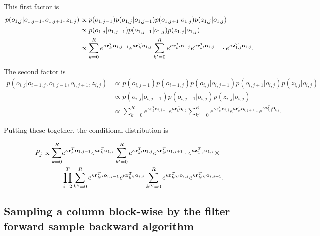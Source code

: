 \documentclass[11pt]{article}
\begin{document}
\noindent This first factor is
%
\begin{align}
\label{eq:first_factor}
p(o_{1,j}|o_{1,j-1},o_{1,j+1},z_{1,j}) &\propto p(o_{1,j-1}) p(o_{1,j}|o_{1,j-1})p(o_{1,j+1}|o_{1,j})p(z_{1,j}|o_{1,j}) \\
&\propto p(o_{1,j}|o_{1,j-1})p(o_{1,j+1}|o_{1,j})p(z_{1,j}|o_{1,j}) \notag \\
&\propto \sum_{k=0}^R e^{\kappa \mathbf{r}_k^T \mathbf{o}_{1,j-1}} e^{\kappa \mathbf{r}_k^T \mathbf{o}_{1,j}}
\sum_{k'=0}^R e^{\kappa \mathbf{r}_{k'}^T \mathbf{o}_{1,j}} e^{\kappa \mathbf{r}_{k'}^T \mathbf{o}_{1,j+1}}
\cdot e^{\kappa \mathbf{z}_{1,j}^T\mathbf{o}_{1,j} }. \notag
\end{align}

\noindent The second factor is
%
\begin{align*}
p(o_{i,j}|o_{i-1,j},o_{i,j-1},o_{i,j+1},z_{i,j}) &\propto p(o_{i,j-1}) p(o_{i-1,j}) p(o_{i,j}|o_{i,j-1})p(o_{i,j+1}|o_{i,j})p(z_{i,j}|o_{i,j}) \\
&\propto p(o_{i,j}|o_{i,j-1})p(o_{i,j+1}|o_{i,j})p(z_{i,j}|o_{i,j}) \\
&\propto \sum_{k=0}^R e^{\kappa \mathbf{r}_k^T \mathbf{o}_{i,j-1}} e^{\kappa \mathbf{r}_k^T \mathbf{o}_{i,j}}
\sum_{k'=0}^R e^{\kappa \mathbf{r}_{k'}^T \mathbf{o}_{i,j}} e^{\kappa \mathbf{r}_{k'}^T \mathbf{o}_{i,j+1}}
\cdot e^{\kappa \mathbf{z}_{i,j}^T\mathbf{o}_{i,j} }.
\end{align*}

\noindent Putting these together, the conditional distribution is

\begin{align}
P_j \propto \sum_{k=0}^R &e^{\kappa \mathbf{r}_k^T \mathbf{o}_{1,j-1}} e^{\kappa \mathbf{r}_k^T \mathbf{o}_{1,j}}
\sum_{k'=0}^R e^{\kappa \mathbf{r}_{k'}^T \mathbf{o}_{1,j}} e^{\kappa \mathbf{r}_{k'}^T \mathbf{o}_{1,j+1}}
\cdot e^{\kappa \mathbf{z}_{1,j}^T\mathbf{o}_{1,j} } \times \\
&\prod_{i=2}^T \sum_{k''=0}^R e^{\kappa \mathbf{r}_{k''}^T\mathbf{o}_{i,j-1}} e^{\kappa \mathbf{r}_{k''}^T\mathbf{o}_{i,j}}
\sum_{k'''=0}^R e^{\kappa \mathbf{r}_{k'''}^T\mathbf{o}_{i,j}} e^{\kappa \mathbf{r}_{k'''}^T\mathbf{o}_{i,j+1}}. \notag
\end{align}

\subsection{Sampling a column block-wise by the filter forward sample backward algorithm}
\end{document}
